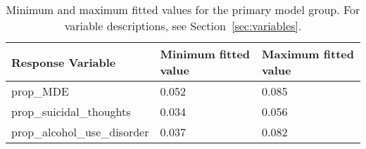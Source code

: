 \documentclass{article}
\begin{document}
\begin{table}[!htb]
\begin{center}
\begin{tabular}{l l l}
    \toprule
    Response Variable & Minimum fitted value & Maximum fitted value\\
    \midrule
    prop\_MDE & 0.052 & 0.085\\
    prop\_suicidal\_thoughts & 0.034 & 0.056\\
    prop\_alcohol\_use\_disorder & 0.037 & 0.082\\
    \bottomrule
\end{tabular}
\end{center}
\caption{\label{tab:fitted} Minimum and maximum fitted values
    for the primary model group. For variable descriptions,
    see Section~\ref{sec:variables}.
}
\end{table}

\pagebreak

\printbibliography
\end{document}
